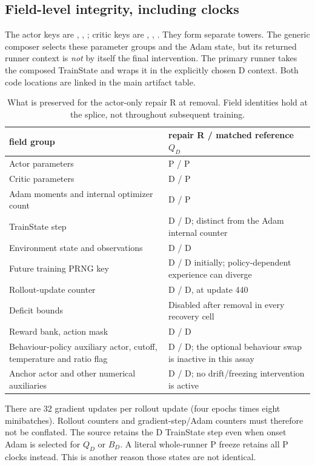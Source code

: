 \subsection{Field-level integrity, including clocks}
The actor keys are , , ; critic keys are , , . They form separate towers. The generic composer selects these parameter groups and the Adam state, but its returned runner context is \emph{not} by itself the final intervention. The primary runner takes the composed TrainState and wraps it in the explicitly chosen D context. Both code locations are linked in the main artifact table.

\begin{table}[ht]
\centering
\caption{What is preserved for the actor-only repair R at removal. Field identities hold at the splice, not throughout subsequent training.}
\label{app:fields}
\small
\begin{tabularx}{\linewidth}{@{}>{\raggedright\arraybackslash}p{5.1cm}X@{}}
\toprule
field group & repair R / matched reference $Q_D$ \\
\midrule
Actor parameters & P / P \\
Critic parameters & D / P \\
Adam moments and internal optimizer count & D / P \\
TrainState step & D / D; distinct from the Adam internal counter \\
Environment state and observations & D / D \\
Future training PRNG key & D / D initially; policy-dependent experience can diverge \\
Rollout-update counter & D / D, at update 440 \\
Deficit bounds & Disabled after removal in every recovery cell \\
Reward bank, action mask & D / D \\
Behaviour-policy auxiliary actor, cutoff, temperature and ratio flag & D / D; the optional behaviour swap is inactive in this assay \\
Anchor actor and other numerical auxiliaries & D / D; no drift/freezing intervention is active \\
\bottomrule
\end{tabularx}
\end{table}

There are 32 gradient updates per rollout update (four epochs times eight minibatches). Rollout counters and gradient-step/Adam counters must therefore not be conflated. The source retains the D TrainState step even when onset Adam is selected for $Q_D$ or $B_D$. A literal whole-runner P freeze retains all P clocks instead. This is another reason those states are not identical.

